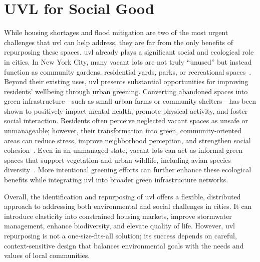 \section{UVL for Social Good}
\label{sec:social_good}

While housing shortages and flood mitigation are two of the most urgent challenges that \acrshort{uvl} can help address, they are far from the only benefits of repurposing these spaces. \acrshort{uvl} already plays a significant social and ecological role in cities. In New York City, many vacant lots are not truly ``unused'' but instead function as community gardens, residential yards, parks, or recreational spaces~\cite{kremer2013social}. Beyond their existing uses, \acrshort{uvl} presents substantial opportunities for improving residents' wellbeing through urban greening. Converting abandoned spaces into green infrastructure---such as small urban farms or community shelters---has been shown to positively impact mental health, promote physical activity, and foster social interaction. Residents often perceive neglected vacant spaces as unsafe or unmanageable; however, their transformation into green, community-oriented areas can reduce stress, improve neighborhood perception, and strengthen social cohesion~\cite{jin2021Can}. Even in an unmanaged state, vacant lots can act as informal green spaces that support vegetation and urban wildlife, including avian species diversity~\cite{dennison2026role}. More intentional greening efforts can further enhance these ecological benefits while integrating \acrshort{uvl} into broader green infrastructure networks.

Overall, the identification and repurposing of \acrshort{uvl} offers a flexible, distributed approach to addressing both environmental and social challenges in cities. It can introduce elasticity into constrained housing markets, improve stormwater management, enhance biodiversity, and elevate quality of life. However, \acrshort{uvl} repurposing is not a one-size-fits-all solution; its success depends on careful, context-sensitive design that balances environmental goals with the needs and values of local communities.
